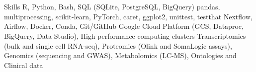 \section{\faGears}{Skills}
 \resumeEntryStart
   {R, Python, Bash, SQL (SQLite, PostgreSQL, BigQuery)}
   {pandas, multiprocessing, scikit-learn, PyTorch, caret, ggplot2, unittest, testthat}
   {Nextflow, Airflow, Docker, Conda, Git/GitHub}  %
   {Google Cloud Platform (GCS, Dataproc, BigQuery, Data Studio), High-performance computing clusters}
   {Transcriptomics (bulk and single cell RNA-seq), Proteomics (Olink and SomaLogic assays), Genomics (sequencing and GWAS), Metabolomics (LC-MS), Ontologies and Clinical data}
 \resumeEntryEnd

\vspace{5pt}
